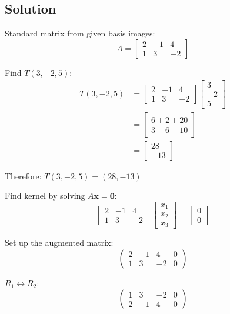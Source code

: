 \subsection*{Solution}

Standard matrix from given basis images:
\[
	A = \begin{bmatrix}
		2 & -1 & 4 \\
		1 & 3 & -2
	\end{bmatrix}
\]

Find $T(3,-2,5)$:
\begin{align*}
	T(3,-2,5) &= \begin{bmatrix}
		2 & -1 & 4 \\
		1 & 3 & -2
	\end{bmatrix} \begin{bmatrix}
		3 \\ -2 \\ 5
	\end{bmatrix} \\
	&= \begin{bmatrix}
		6 + 2 + 20 \\
		3 - 6 - 10
	\end{bmatrix} \\
	&= \begin{bmatrix}
		28 \\ -13
	\end{bmatrix}
\end{align*}

Therefore: $T(3,-2,5) = (28, -13)$

Find kernel by solving $A\mathbf{x} = \mathbf{0}$:
\[
	\begin{bmatrix}
		2 & -1 & 4 \\
		1 & 3 & -2
	\end{bmatrix} \begin{bmatrix}
		x_1 \\ x_2 \\ x_3
	\end{bmatrix} = \begin{bmatrix}
		0 \\ 0
	\end{bmatrix}
\]

Set up the augmented matrix:
\[
	\left(\begin{array}{ccc|c}
		2 & -1 & 4 & 0 \\
		1 & 3 & -2 & 0
	\end{array}\right)
\]

$R_1 \leftrightarrow R_2$:
\[
	\left(\begin{array}{ccc|c}
		1 & 3 & -2 & 0 \\
		2 & -1 & 4 & 0
	\end{array}\right)
\]

